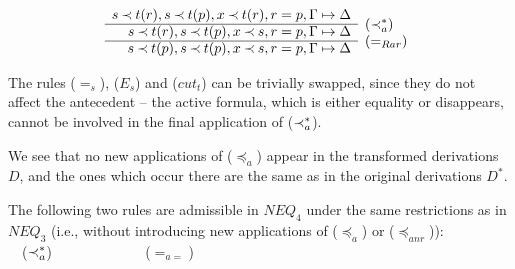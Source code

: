 \begin{PROOF}
\begin{LS}
\[ \begin{array}{rl}
s\Incl t(r), s\Incl t(p), x\Incl t(r), r=p, \GSD \\ \cline{1-1}
s\Incl t(r), s\Incl t(p), x\Incl s, r=p, \GSD & \rabove{(\Incl_a^*)} \\ \cline{1-1}
s\Incl t(p), s\Incl t(p), x\Incl s, r=p, \GSD & \rabove{(=_{Rar})} \end{array} \]
%
\item The rules ($=_s$), ($E_s$) and ($cut_t$) can be trivially swapped, since they do
not affect the antecedent -- the active formula, which is either equality or
disappears, cannot be involved in the final application of ($\mathbin{\prec}_a^*$).
\end{LS}
We see that no new applications of ($\preceq_a$) appear in the transformed derivations 
$D$, and the ones which occur there are the same as in the original derivations $D^*$.
\end{PROOF}
%
%
\begin{LEMMA}\label{le:asinNEQ3}
The following two rules are admissible in $NEQ_4$ under the same restrictions
as in $NEQ_3$ (i.e., without introducing new applications of ($\preceq_a$) or
($\preceq_{anr}$)): \\[1ex]
\hspace*{3em}
\ \ ($\mathbin{\prec}_a^*$) 
\ \ \ \ \ \ \ \ \ \ \ \ 
 ($=_{a=}$) \\[3ex]
\end{LEMMA}
